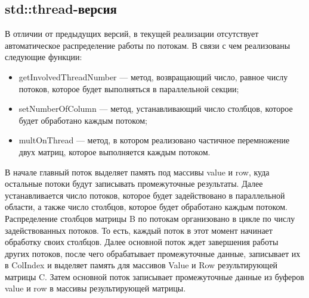 \documentclass{report}
\begin{document}
\subsection*{std::thread-версия}
\par В отличии от предыдущих версий, в текущей реализации отсутствует автоматическое распределение работы по потокам. В связи с чем реализованы следующие функции:
\begin{itemize}
	\item getInvolvedThreadNumber — метод, возвращающий число, равное числу потоков, которое будет выполняться в параллельной секции;
	\item setNumberOfColumn — метод, устанавливающий число столбцов, которое будет обработано каждым потоком;
	\item multOnThread — метод,  в котором реализовано частичное перемножение двух матриц, которое выполняется каждым потоком.
\end{itemize}
\par В начале главный поток выделяет память под массивы value и row, куда остальные потоки будут записывать промежуточные результаты. Далее устанавливается число потоков, которое будет задействовано в параллельной области, а также число столбцов, которое будет обработано каждым потоком. Распределение столбцов матрицы B по потокам организовано в цикле по числу задействованных потоков. То есть, каждый поток в этот момент начинает обработку своих столбцов. Далее основной поток ждет завершения работы других потоков, после чего обрабатывает промежуточные данные, записывает их в ColIndex и выделяет память для массивов Value и Row результирующей матрицы C. Затем основной поток записывает промежуточные данные из буферов value и row в массивы результирующей матрицы.
\newpage
\end{document}
